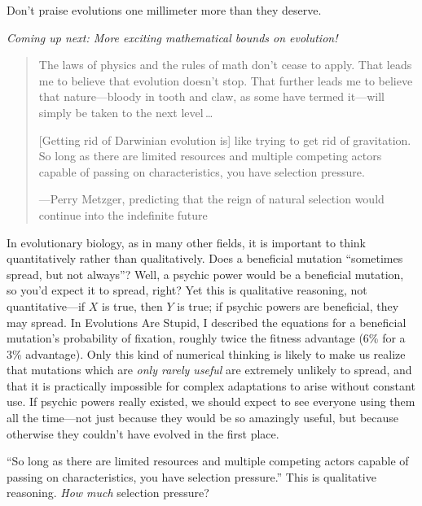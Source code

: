 {{
 Don't praise evolutions one millimeter more than
they deserve.}

{
 \textit{Coming up next: More exciting mathematical bounds on
evolution!}}

\myendsectiontext


\bigskip


\begin{quotation}
{
 The laws of physics and the rules of math don't
cease to apply. That leads me to believe that evolution
doesn't stop. That further leads me to believe that
nature---bloody in tooth and claw, as some have termed it---will simply
be taken to the next level\,\ldots}

{
 [Getting rid of Darwinian evolution is] like trying to get rid of
gravitation. So long as there are limited resources and multiple
competing actors capable of passing on characteristics, you have
selection pressure.}

{\raggedleft
 {}---Perry Metzger, predicting that the reign of natural selection
would continue into the indefinite future
\par}
\end{quotation}


{
 In evolutionary biology, as in many other fields, it is important
to think quantitatively rather than qualitatively. Does a beneficial
mutation ``sometimes spread, but not
always''? Well, a psychic power would be a beneficial
mutation, so you'd expect it to spread, right? Yet this
is qualitative reasoning, not quantitative---if $X$ is true, then $Y$ is
true; if psychic powers are beneficial, they may spread. In Evolutions
Are Stupid, I described the equations for a beneficial
mutation's probability of fixation, roughly twice the
fitness advantage (6\% for a 3\% advantage). Only this kind of
numerical thinking is likely to make us realize that mutations which
are \textit{only rarely useful} are extremely unlikely to spread, and
that it is practically impossible for complex adaptations to arise
without constant use. If psychic powers really existed, we should
expect to see everyone using them all the time---not just because they
would be so amazingly useful, but because otherwise they
couldn't have evolved in the first place.}

{
 ``So long as there are limited resources and
multiple competing actors capable of passing on characteristics, you
have selection pressure.'' This is qualitative
reasoning. \textit{How much} selection pressure?}

}
